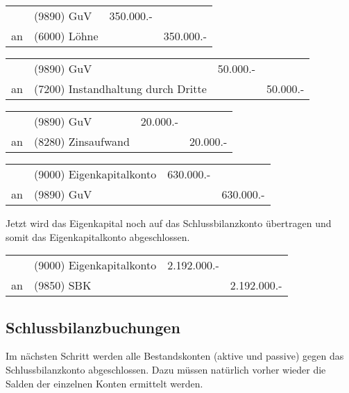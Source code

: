 \documentclass[parskip=half,12pt,a4paper]{scrartcl}
\begin{document}
\begin{center}
	\begin{tabularx}{\textwidth}{rXrr}
		\toprule
		& (9890) GuV & 350.000.- &\\
		an & (6000) Löhne & & 350.000.-\\
		\bottomrule
	\end{tabularx}
\end{center}

\begin{center}
\begin{tabularx}{\textwidth}{rXrr}
 \toprule
    & (9890) GuV & 50.000.- &\\
 an & (7200) Instandhaltung durch Dritte & & 50.000.-\\
\bottomrule
\end{tabularx}
\end{center}

\begin{center}
	\begin{tabularx}{\textwidth}{rXrr}
		\toprule
		& (9890) GuV & 20.000.- &\\
		an & (8280) Zinsaufwand & & 20.000.-\\
		\bottomrule
	\end{tabularx}
\end{center}

\begin{center}
\begin{tabularx}{\textwidth}{rXrr}
 \toprule
    & (9000) Eigenkapitalkonto & 630.000.- &\\
 an & (9890) GuV & & 630.000.-\\
\bottomrule
\end{tabularx}
\end{center}

Jetzt wird das Eigenkapital noch auf das Schlussbilanzkonto übertragen und somit das Eigenkapitalkonto abgeschlossen.

\begin{center}
	\begin{tabularx}{\textwidth}{rXrr}
		\toprule
		& (9000) Eigenkapitalkonto & 2.192.000.- &\\
		an & (9850) SBK & & 2.192.000.-\\
		\bottomrule
	\end{tabularx}
\end{center}

\subsection{Schlussbilanzbuchungen}
Im nächsten Schritt werden alle Bestandskonten (aktive und passive) gegen das Schlussbilanzkonto abgeschlossen. Dazu müssen natürlich vorher wieder die Salden der einzelnen Konten ermittelt werden.
\end{document}
